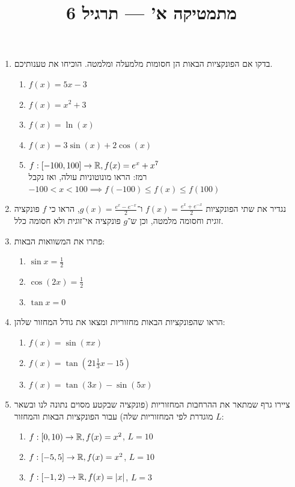
\setcounter{secnumdepth}{6}

\title{מתמטיקה א' --- תרגיל 6}
\date{}



\maketitle

\begin{enumerate}
	\item
		בדקו אם הפונקציות הבאות הן חסומות מלמעלה ומלמטה.
		הוכיחו את טענותיכם.
		\begin{enumerate}
			\item $f(x) = 5x - 3$
			\item $f(x) = x^2 + 3$
			\item $f(x) = \ln(x)$
			\item $f(x) = 3 \sin(x) + 2 \cos(x)$
			\item $f : [-100, 100] \to \mathbb{R}, f(x) = e^x + x^7$ \\
				רמז: הראו מונוטוניות עולה, ואז נקבל $-100 < x < 100 \implies f(-100) \le f(x) \le f(100)$
		\end{enumerate}

	\item
		נגדיר את שתי הפונקציות $f(x) = \frac{e^x + e^{-x}}{2}$ ו־$g(x) = \frac{e^x - e^{-x}}{2}$,
		הראו כי $f$ פונקציה זוגית וחסומה מלמטה, וכן ש־$g$ פונקציה אי־זוגית ולא חסומה כלל.

	\item
		פתרו את המשוואות הבאות:
		\begin{enumerate}
			\item $\sin x = \frac{1}{2}$
			\item $\cos(2 x) = \frac{1}{2}$
			\item $\tan x = 0$
		\end{enumerate}

	\item
		הראו שהפונקציות הבאות מחזוריות ומצאו את גודל המחזור שלהן:
		\begin{enumerate}
			\item $f(x) = \sin(\pi x)$
			\item $f(x) = \tan(21 \frac{1}{3} x - 15)$
			\item $f(x) = \tan(3 x) - \sin(5 x)$
		\end{enumerate}

	\item
		ציירו גרף שמתאר את ההרחבות המחזוריות (פונקציה שבקטע מסוים נתונה לנו ובשאר מוגדרת לפי המחזוריות שלה) עבור הפונקציות הבאות והמחזור $L$:
		\begin{enumerate}
			\item $f : [0, 10) \to \mathbb{R}, f(x) = x^2$, $L = 10$
			\item $f : [-5, 5] \to \mathbb{R}, f(x) = x^2$, $L = 10$
			\item $f : [-1, 2) \to \mathbb{R}, f(x) = |x|$, $L = 3$
		\end{enumerate}
\end{enumerate}


